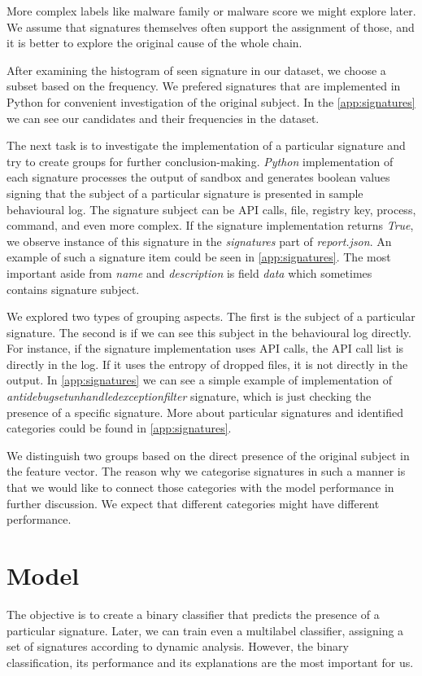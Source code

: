 More complex labels like malware family or malware score we might explore later. We assume that signatures themselves often support the assignment of those, and it is better to explore the original cause of the whole chain.

After examining the histogram of seen signature in our dataset, we choose a subset based on the frequency. We prefered signatures that are implemented in Python for convenient investigation of the original subject. In the \ref{app:signatures} we can see our candidates and their frequencies in the dataset.

The next task is to investigate the implementation of a particular signature and try to create groups for further conclusion-making. \emph{Python} implementation of each signature processes the output of sandbox and generates boolean values signing that the subject of a particular signature is presented in sample behavioural log. The signature subject can be API calls, file, registry key, process, command, and even more complex. If the signature implementation returns \emph{True}, we observe instance of this signature in the \emph{signatures} part of \emph{report.json}. An example of such a signature item could be seen in \ref{app:signatures}. The most important aside from \emph{name} and \emph{description} is field \emph{data} which sometimes contains signature subject.

We explored two types of grouping aspects. The first is the subject of a particular signature. The second is if we can see this subject in the behavioural log directly. For instance, if the signature implementation uses API calls, the API call list is directly in the log. If it uses the entropy of dropped files, it is not directly in the output. In \ref{app:signatures} we can see a simple example of implementation of \emph{antidebugsetunhandledexceptionfilter} signature, which is just checking the presence of a specific signature.
More about particular signatures and identified categories could be found in \ref{app:signatures}. 

We distinguish two groups based on the direct presence of the original subject in the feature vector. The reason why we categorise signatures in such a manner is that we would like to connect those categories with the model performance in further discussion. We expect that different categories might have different performance.

\section{Model}
The objective is to create a binary classifier that predicts the presence of a particular signature. Later, we can train even a multilabel classifier, assigning a set of signatures according to dynamic analysis. However, the binary classification, its performance and its explanations are the most important for us. 


